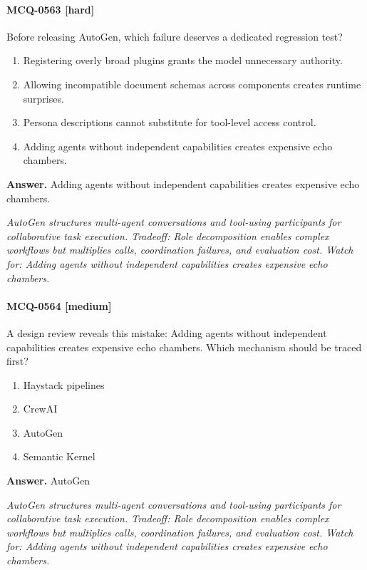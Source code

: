 \paragraph{MCQ-0563 [hard]} Before releasing AutoGen, which failure deserves a dedicated regression test?
\begin{enumerate}[label=\Alph*.]
\item Registering overly broad plugins grants the model unnecessary authority.
\item Allowing incompatible document schemas across components creates runtime surprises.
\item Persona descriptions cannot substitute for tool-level access control.
\item Adding agents without independent capabilities creates expensive echo chambers.
\end{enumerate}
\noindent\textbf{Answer.} Adding agents without independent capabilities creates expensive echo chambers.
\par\textit{AutoGen structures multi-agent conversations and tool-using participants for collaborative task execution. Tradeoff: Role decomposition enables complex workflows but multiplies calls, coordination failures, and evaluation cost. Watch for: Adding agents without independent capabilities creates expensive echo chambers.}
\paragraph{MCQ-0564 [medium]} A design review reveals this mistake: Adding agents without independent capabilities creates expensive echo chambers. Which mechanism should be traced first?
\begin{enumerate}[label=\Alph*.]
\item Haystack pipelines
\item CrewAI
\item AutoGen
\item Semantic Kernel
\end{enumerate}
\noindent\textbf{Answer.} AutoGen
\par\textit{AutoGen structures multi-agent conversations and tool-using participants for collaborative task execution. Tradeoff: Role decomposition enables complex workflows but multiplies calls, coordination failures, and evaluation cost. Watch for: Adding agents without independent capabilities creates expensive echo chambers.}
